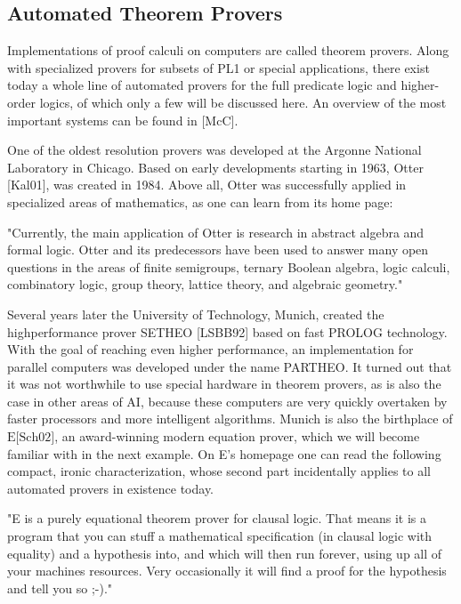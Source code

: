 \documentclass[10pt]{article}
\begin{document}
\subsection*{Automated Theorem Provers}
Implementations of proof calculi on computers are called theorem provers. Along with specialized provers for subsets of PL1 or special applications, there exist today a whole line of automated provers for the full predicate logic and higher-order logics, of which only a few will be discussed here. An overview of the most important systems can be found in [McC].

One of the oldest resolution provers was developed at the Argonne National Laboratory in Chicago. Based on early developments starting in 1963, Otter [Kal01], was created in 1984. Above all, Otter was successfully applied in specialized areas of mathematics, as one can learn from its home page:

\begin{displayquote}
"Currently, the main application of Otter is research in abstract algebra and formal logic. Otter and its predecessors have been used to answer many open questions in the areas of finite semigroups, ternary Boolean algebra, logic calculi, combinatory logic, group theory, lattice theory, and algebraic geometry."
\end{displayquote}

Several years later the University of Technology, Munich, created the highperformance prover SETHEO [LSBB92] based on fast PROLOG technology. With the goal of reaching even higher performance, an implementation for parallel computers was developed under the name PARTHEO. It turned out that it was not worthwhile to use special hardware in theorem provers, as is also the case in other areas of AI, because these computers are very quickly overtaken by faster processors and more intelligent algorithms. Munich is also the birthplace of $\mathrm{E}[\mathrm{Sch02]}$, an award-winning modern equation prover, which we will become familiar with in the next example. On E's homepage one can read the following compact, ironic characterization, whose second part incidentally applies to all automated provers in existence today.

\begin{displayquote}
"E is a purely equational theorem prover for clausal logic. That means it is a program that you can stuff a mathematical specification (in clausal logic with equality) and a hypothesis into, and which will then run forever, using up all of your machines resources. Very occasionally it will find a proof for the hypothesis and tell you so ;-)."
\end{displayquote}
\end{document}
